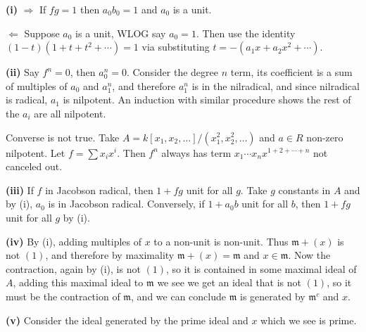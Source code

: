 \textbf{(i)} $\Rightarrow$ If $fg=1$ then $a_0b_0=1$ and $a_0$ is a unit.

$\Leftarrow$ Suppose $a_0$ is a unit, WLOG say $a_0=1$. Then use the identity $(1-t)(1+t+t^2+\cdots)=1$ via substituting $t=-(a_1x+a_2x^2+\cdots)$.

\textbf{(ii)} Say $f^n=0$, then $a_0^n=0$. Consider the degree $n$ term, its coefficient is a sum of multiples of $a_0$ and $a_1^n$, and therefore $a_1^n$ is in the nilradical, and since nilradical is radical, $a_1$ is nilpotent. An induction with similar procedure shows the rest of the $a_i$ are all nilpotent.

Converse is not true. Take $A=k[x_1,x_2,\ldots]/(x_1^2,x_2^2,\ldots)$ and $a\in R$ non-zero nilpotent. Let $f=\sum x_i x^i$. Then $f^n$ always has term $x_1\cdots x_n x^{1+2+\cdots+n}$ not canceled out.

\textbf{(iii)} If $f$ in Jacobson radical, then $1+fg$ unit for all $g$. Take $g$ constants in $A$ and by (i), $a_0$ is in Jacobson radical. Conversely, if $1+a_0b$ unit for all $b$, then $1+fg$ unit for all $g$ by (i).

\textbf{(iv)} By (i), adding multiples of $x$ to a non-unit is non-unit. Thus $\mathfrak m+(x)$ is not $(1)$, and therefore by maximality $\mathfrak m+(x)=\mathfrak m$ and $x\in\mathfrak m$. Now the contraction, again by (i), is not $(1)$, so it is contained in some maximal ideal of $A$, adding this maximal ideal to $\mathfrak m$ we see we get an ideal that is not $(1)$, so it must be the contraction of $\mathfrak m$, and we can conclude $\mathfrak m$ is generated by $\mathfrak m^c$ and $x$.

\textbf{(v)} Consider the ideal generated by the prime ideal and $x$ which we see is prime.
